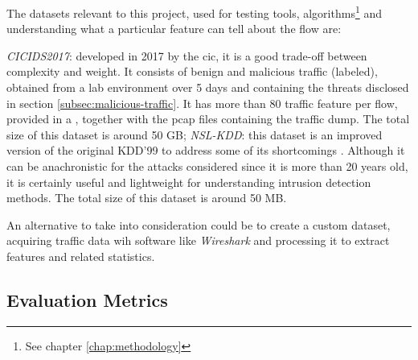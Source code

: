 \noindent The datasets relevant to this project, used for testing tools, algorithms\footnote{See chapter \ref{chap:methodology}} and understanding what a particular feature can tell about the flow are: 
\begin{itemize}
    \itemAR \textit{CICIDS2017}: developed in 2017 by the \gls{cic}, it is a good trade-off between complexity and weight. It consists of benign and malicious traffic (labeled), obtained from a lab environment over 5 days and containing the threats disclosed in section \ref{subsec:malicious-traffic}. It has more than 80 traffic feature per flow, provided in a , together with the \gls{pcap} files containing the traffic dump. The total size of this dataset is around 50 GB;
    \itemAR \textit{NSL-KDD}: this dataset is an improved version of the original KDD'99 \cite{Tavallaee2009} to address some of its shortcomings \cite{McHugh2000}. Although it can be anachronistic for the attacks considered since it is more than 20 years old, it is certainly useful and lightweight for understanding intrusion detection methods. The total size of this dataset is around 50 MB.
\end{itemize}

\noindent An alternative to take into consideration could be to create a custom dataset, acquiring traffic data wih software like \textit{Wireshark} \cite{WiresharkWebsite} and processing it to extract features and related statistics.


\subsection{Evaluation Metrics}
\label{subsec:detection-rates}

